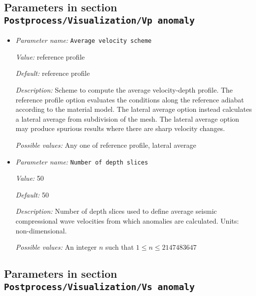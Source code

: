\subsection{Parameters in section \tt Postprocess/Visualization/Vp anomaly}
\label{parameters:Postprocess/Visualization/Vp_20anomaly}

\begin{itemize}
\item {\it Parameter name:} {\tt Average velocity scheme}
\label{parameters:Postprocess/Visualization/Vp anomaly/Average velocity scheme}
\label{parameters:Postprocess/Visualization/Vp_20anomaly/Average_20velocity_20scheme}


{\it Value:} reference profile


{\it Default:} reference profile


{\it Description:} Scheme to compute the average velocity-depth profile. The reference profile option evaluates the conditions along the reference adiabat according to the material model. The lateral average option instead calculates a lateral average from subdivision of the mesh. The lateral average option may produce spurious results where there are sharp velocity changes.


{\it Possible values:} Any one of reference profile, lateral average
\item {\it Parameter name:} {\tt Number of depth slices}
\label{parameters:Postprocess/Visualization/Vp anomaly/Number of depth slices}
\label{parameters:Postprocess/Visualization/Vp_20anomaly/Number_20of_20depth_20slices}


{\it Value:} 50


{\it Default:} 50


{\it Description:} Number of depth slices used to define average seismic compressional wave velocities from which anomalies are calculated. Units: non-dimensional.


{\it Possible values:} An integer $n$ such that $1\leq n \leq 2147483647$
\end{itemize}

\subsection{Parameters in section \tt Postprocess/Visualization/Vs anomaly}
\label{parameters:Postprocess/Visualization/Vs_20anomaly}

